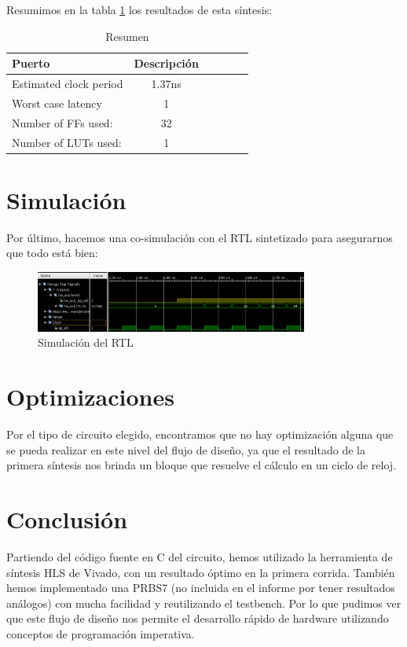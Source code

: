 Resumimos en la tabla \ref{tab:resumen31} los resultados de esta síntesis:
\begin{table}[!h]
\centering
\caption{Resumen}
\label{tab:resumen31}
\begin{tabular}{@{}lccccc@{}}
\toprule
Puerto & Descripción\\ \midrule
Estimated clock period  & 1.37ns     \\ \midrule
Worst case latency &  1 \\\midrule
Number of FFs used: & 32\\\midrule
Number of LUTs used: & 1 \\\bottomrule
\end{tabular}
\end{table}

\section{Simulación}

Por último, hacemos una co-simulación con el RTL sintetizado para asegurarnos que todo está bien:
\begin{figure}[!h]
\centering
\includegraphics[width=0.8\textwidth]{figuras/waveform-prbs31}
\caption{Simulación del RTL}
\label{fig:waveform-prbs31}
\end{figure}
\section{Optimizaciones}
Por el tipo de circuito elegido, encontramos que no hay optimización alguna que se pueda realizar en este nivel del flujo de diseño, ya que el resultado de la primera síntesis nos brinda un bloque que resuelve el cálculo en un ciclo de reloj.

\section{Conclusión}
Partiendo del código fuente en C del circuito, hemos utilizado la herramienta de síntesis HLS de Vivado, con un resultado óptimo en la primera corrida. También hemos implementado una PRBS7 (no incluida en el informe por tener resultados análogos) con mucha facilidad y reutilizando el testbench. Por lo que pudimos ver que este flujo de diseño nos permite el desarrollo rápido de hardware utilizando conceptos de programación imperativa.


